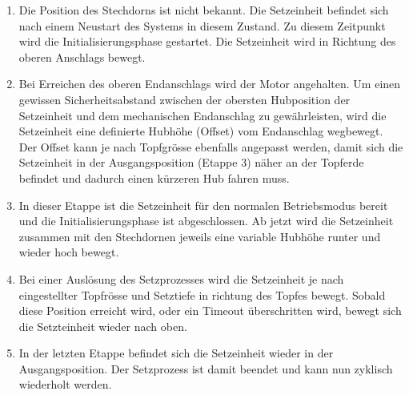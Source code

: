 \begin{enumerate}
	\item Die Position des Stechdorns ist nicht bekannt. Die Setzeinheit befindet sich nach einem Neustart des Systems in diesem Zustand. Zu diesem Zeitpunkt wird die Initialisierungsphase gestartet. Die Setzeinheit wird in Richtung des oberen Anschlags bewegt.
	\item Bei Erreichen des oberen Endanschlags wird der Motor angehalten. Um einen gewissen Sicherheitsabstand zwischen der obersten Hubposition der Setzeinheit und dem mechanischen Endanschlag zu gewährleisten, wird die Setzeinheit eine definierte Hubhöhe (Offset) vom Endanschlag wegbewegt. Der Offset kann je nach Topfgrösse ebenfalls angepasst werden, damit sich die Setzeinheit in der Ausgangsposition (Etappe 3) näher an der Topferde befindet und dadurch einen kürzeren Hub fahren muss.
	\item In dieser Etappe ist die Setzeinheit für den normalen Betriebsmodus bereit und die Initialisierungsphase ist abgeschlossen. Ab jetzt wird die Setzeinheit zusammen mit den Stechdornen jeweils eine variable Hubhöhe runter und wieder hoch bewegt.
	\item  Bei einer Auslösung des Setzprozesses wird die Setzeinheit je nach eingestellter Topfrösse und Setztiefe in richtung des Topfes bewegt. Sobald diese Position erreicht wird, oder ein Timeout überschritten wird, bewegt sich die Setzteinheit wieder nach oben.
	\item In der letzten Etappe befindet sich die Setzeinheit wieder in der Ausgangsposition. Der Setzprozess ist damit beendet und kann nun zyklisch wiederholt werden.
\end{enumerate}
